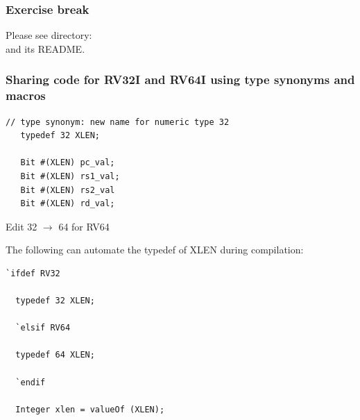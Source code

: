 
\begin{frame}[fragile]
\frametitle{\EmojiExercise \hmm Exercise break}

Please see directory:  \\
and its README.

\end{frame}


\begin{frame}[fragile]
\frametitle{Sharing code for RV32I and RV64I using type synonyms and macros}

\footnotesize

\begin{center}
 \begin{minipage}{0.5\textwidth}
  \begin{Verbatim}[frame=single]
   // type synonym: new name for numeric type 32
   typedef 32 XLEN;

   Bit #(XLEN) pc_val;
   Bit #(XLEN) rs1_val;
   Bit #(XLEN) rs2_val
   Bit #(XLEN) rd_val;
  \end{Verbatim}

  \vspace{1ex}

  Edit 32 $\rightarrow$ 64 for RV64
 \end{minipage}
 \hmmm
 \begin{minipage}{0.35\textwidth}
  The following can automate the typedef of XLEN during compilation:

  \vspace{2ex}

  \begin{Verbatim}[frame=single, label=in src\_Common/Arch.bsv]
  `ifdef RV32

  typedef 32 XLEN;

  `elsif RV64

  typedef 64 XLEN;

  `endif

  Integer xlen = valueOf (XLEN);
  \end{Verbatim}
 \end{minipage}
\end{center}

\end{frame}


